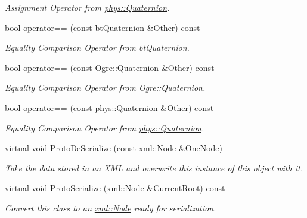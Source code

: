\begin{DoxyCompactItemize}
\begin{DoxyCompactList}\small\item\em Assignment Operator from \hyperlink{classphys_1_1Quaternion}{phys::Quaternion}. \item\end{DoxyCompactList}\item 
bool \hyperlink{classphys_1_1Quaternion_a652ec257cb1ab788db646b85f3f89af3}{operator==} (const btQuaternion \&Other) const 
\begin{DoxyCompactList}\small\item\em Equality Comparison Operator from btQuaternion. \item\end{DoxyCompactList}\item 
bool \hyperlink{classphys_1_1Quaternion_a75ab11099a0479885ae5f42945621ef9}{operator==} (const Ogre::Quaternion \&Other) const 
\begin{DoxyCompactList}\small\item\em Equality Comparison Operator from Ogre::Quaternion. \item\end{DoxyCompactList}\item 
bool \hyperlink{classphys_1_1Quaternion_aa02dc20b4246e16017b70788449d7012}{operator==} (const \hyperlink{classphys_1_1Quaternion}{phys::Quaternion} \&Other) const 
\begin{DoxyCompactList}\small\item\em Equality Comparison Operator from \hyperlink{classphys_1_1Quaternion}{phys::Quaternion}. \item\end{DoxyCompactList}\item 
virtual void \hyperlink{classphys_1_1Quaternion_a71e3d4afb129ff822edbc700bae16b4b}{ProtoDeSerialize} (const \hyperlink{classphys_1_1xml_1_1Node}{xml::Node} \&OneNode)
\begin{DoxyCompactList}\small\item\em Take the data stored in an XML and overwrite this instance of this object with it. \item\end{DoxyCompactList}\item 
virtual void \hyperlink{classphys_1_1Quaternion_ab71a780a5103681126d04fec42cdcb2e}{ProtoSerialize} (\hyperlink{classphys_1_1xml_1_1Node}{xml::Node} \&CurrentRoot) const 
\begin{DoxyCompactList}\small\item\em Convert this class to an \hyperlink{classphys_1_1xml_1_1Node}{xml::Node} ready for serialization. \item\end{DoxyCompactList}\item 

\end{DoxyCompactItemize}
